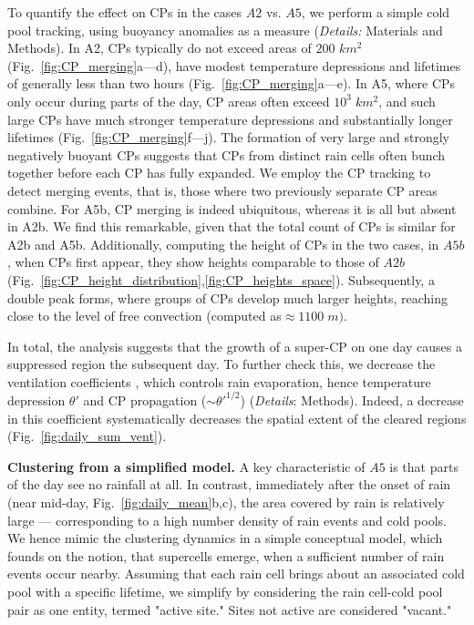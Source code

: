 \documentclass[draft,linenumbers]{agujournal2019}
\begin{document}
To quantify the effect on CPs in the cases $A2$ vs. $A5$, we perform a simple cold pool tracking, using buoyancy anomalies as a measure ({\it Details:} Materials and Methods).
In A2, CPs typically do not exceed areas of $200$ $km^2$ (Fig.~\ref{fig:CP_merging}a---d), have modest temperature depressions and lifetimes of generally less than two hours (Fig.~\ref{fig:CP_merging}a---e). 
In A5, where CPs only occur during parts of the day, CP areas often exceed $10^3\;km^2$, and such large CPs have much stronger temperature depressions  and substantially longer lifetimes (Fig.~\ref{fig:CP_merging}f---j). 
The formation of very large and strongly negatively buoyant CPs suggests that CPs from distinct rain cells often bunch together before each CP has fully expanded. 
We employ the CP tracking to detect merging events, that is, those where two previously separate CP areas combine.
For A5b, CP merging is indeed ubiquitous, whereas it is all but absent in A2b.
We find this remarkable, given that the total count of CPs is similar for A2b and A5b.
Additionally, computing the height of CPs in the two cases, in $A5b$, when CPs first appear, they show heights comparable to those of $A2b$ (Fig.~\ref{fig:CP_height_distribution},\ref{fig:CP_heights_space}). 
Subsequently, a double peak forms, where groups of CPs develop much larger heights, reaching close to the level of free convection (computed as$\approx 1100\;m)$.

In total, the analysis suggests that the growth of a super-CP on one day causes a suppressed region the subsequent day. 
To further check this, we decrease the ventilation coefficients \cite{seifert2006two}, which controls rain evaporation, hence temperature depression $\theta'$ and CP propagation ($\sim \theta'^{1/2}$) ({\it Details}: Methods).
Indeed, a decrease in this coefficient systematically decreases the spatial extent of the cleared regions (Fig.~\ref{fig:daily_sum_vent}).

\noindent
{\bf Clustering from a simplified model.}
A key characteristic of $A5$ is that parts of the day see no rainfall at all. 
In contrast, immediately after the onset of rain (near mid-day, Fig.~\ref{fig:daily_mean}b,c), the area covered by rain is relatively large --- corresponding to a high number density of rain events and cold pools.
We hence mimic the clustering dynamics in a simple conceptual model, which founds on the notion, that supercells emerge, when a sufficient number of rain events occur nearby. 
Assuming that each rain cell brings about an associated cold pool with a specific lifetime, we simplify by considering the rain cell-cold pool pair as one entity, termed "active site." 
Sites not active are considered "vacant."
\end{document}

